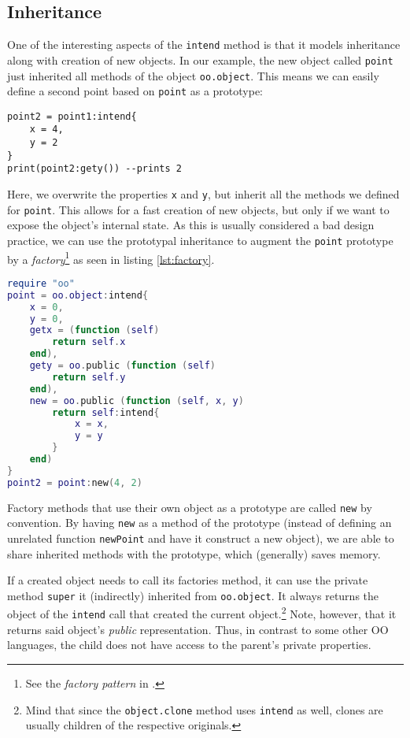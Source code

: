 \subsection{Inheritance}

One of the interesting aspects of the \texttt{intend} method is that it models inheritance along with creation of new objects. In our example, the new object called \texttt{point} just inherited all methods of the object \texttt{oo.object}. This means we can easily define a second point based on \texttt{point} as a prototype:

\begin{lstlisting}[caption={Using \texttt{point1} as a protoype (continued from listing \ref{lst:point})}, label=lst:point2, name=lst:point]
point2 = point1:intend{
	x = 4,
	y = 2
}
print(point2:gety()) --prints 2
\end{lstlisting}

Here, we overwrite the properties \texttt{x} and \texttt{y}, but inherit all the methods we defined for \texttt{point}. This allows for a fast creation of new objects, but only if we want to expose the object's internal state. As this is usually considered a bad design practice, we can use the prototypal inheritance to augment the \texttt{point} prototype by a \emph{factory}\footnote{See the \emph{factory pattern} in \cite{GOF}.} as seen in listing \ref{lst:factory}.

\begin{lstlisting}[language=lua, caption={Building a factory for points.}, label=lst:factory, name=lst:factory]
require "oo"
point = oo.object:intend{
	x = 0,
	y = 0,
	getx = (function (self)
		return self.x
	end),
	gety = oo.public (function (self)
		return self.y
	end),
	new = oo.public (function (self, x, y)
		return self:intend{
			x = x,
			y = y
		}
	end)
}
point2 = point:new(4, 2)
\end{lstlisting}

Factory methods that use their own object as a prototype are called \texttt{new} by convention. By having \texttt{new} as a method of the prototype (instead of defining an unrelated function \texttt{newPoint} and have it construct a new object), we are able to share inherited methods with the prototype, which (generally) saves memory.

If a created object needs to call its factories method, it can use the private method \texttt{super} it (indirectly) inherited from \texttt{oo.object}. It always returns the object of the \texttt{intend} call that created the current object.\footnote{Mind that since the \texttt{object.clone} method uses \texttt{intend} as well, clones are usually children of the respective originals.} Note, however, that it returns said object's \emph{public} representation. Thus, in contrast to some other OO languages, the child does not have access to the parent's private properties.

